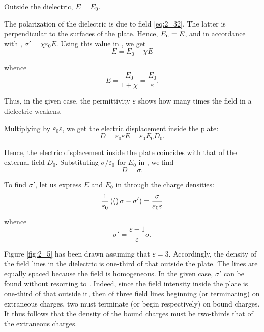 \noindent
Outside the dielectric, $E=E_0$.

The polarization of the dielectric is due to field \eqref{eq:2_32}. The latter is perpendicular to the surfaces of the plate. Hence, $E_{\text{n}}=E$, and in accordance with , $\sigma'=\chi\varepsilon_0E$. Using this value in , we get
\begin{equation*}
    E = E_0 - \chi E
\end{equation*}

\noindent
whence
\begin{equation}\label{eq:2_33}
    E = \frac{E_0}{1 + \chi} = \frac{E_0}{\varepsilon}.
\end{equation}

\noindent
Thus, in the given case, the permittivity $\varepsilon$
shows how many times the field in a dielectric weakens.

Multiplying  by $\varepsilon_0\varepsilon$, we get the electric displacement inside the plate:
\begin{equation}\label{eq:2_34}
    D = \varepsilon_0 \varepsilon E = \varepsilon_0 E_0 D_0.
\end{equation}

\noindent
Hence, the electric displacement inside the plate coincides with that of the external field $D_0$. Substituting $\sigma/\varepsilon_0$ for $E_0$ in , we find
\begin{equation}\label{eq:2_35}
    D = \sigma.
\end{equation}

To find $\sigma'$, let us express $E$ and $E_0$ in  through the charge densities:
\begin{equation*}
    \frac{1}{\varepsilon_0} \left((\right)\sigma - \sigma') = \frac{\sigma}{\varepsilon_0\varepsilon}
\end{equation*}

\noindent
whence
\begin{equation}\label{eq:2_36}
    \sigma' = \frac{\varepsilon - 1}{\varepsilon} \sigma.
\end{equation}

Figure \ref{fig:2_5} has been drawn assuming that $\varepsilon=3$. Accordingly, the density of the field lines in the dielectric is one-third of that outside the plate. The lines are equally spaced because the field is homogeneous. In the given case, $\sigma'$ can be found without resorting to . Indeed, since the field intensity inside the plate is one-third of that outside it, then of three field lines beginning (or terminating) on
extraneous charges, two must terminate (or begin respectively) on bound charges. It thus follows that the density of the bound charges must be two-thirds that of the extraneous charges.

